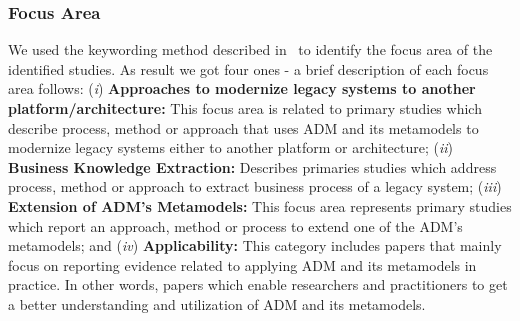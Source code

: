 \subsubsection{Focus Area}

We used the keywording method described in~\cite{Petersen:2008:SMS:2227115.2227123} to identify the focus area of the identified studies. As result we got four ones - a brief description of each focus area follows: (\textit{i}) \textbf{Approaches to modernize legacy systems to another platform/architecture:} This focus area is related to primary studies which describe process, method or approach that uses ADM and its metamodels to modernize legacy systems either to another platform  or architecture; (\textit{ii}) \textbf{Business Knowledge Extraction:} Describes primaries studies which address process, method or approach to extract business process of a legacy system; (\textit{iii}) \textbf{Extension of ADM's Metamodels:} This focus area represents primary studies which report an approach, method or process to extend one of the ADM's metamodels; and (\textit{iv}) \textbf{Applicability:} This category includes papers that mainly focus on reporting evidence related to applying ADM and its metamodels in practice. In other words, papers which enable researchers and practitioners to get a better understanding and utilization of ADM and its metamodels.






